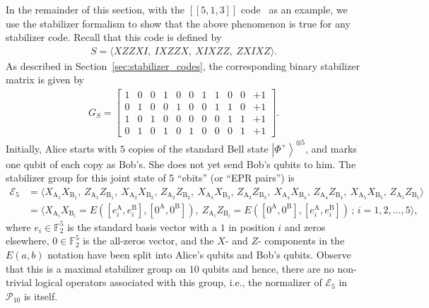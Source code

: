 \documentclass[journal,onecolumn]{IEEEtran}
\newcommand{\dket}[1]{\left\lvert #1 \right\rangle}
\newcommand{\llbr}{[\![}
\newcommand{\rrbr}{]\!]}
\newif\ifnotes
\newcommand{\narayanan}[1]{\ifnotes{{\color{blue} [Narayanan: #1]}}\fi}
\newcommand{\bane}[1]{\ifnotes{{\color{dkgreen} [Bane: #1]}}\fi}
\begin{document}
In the remainder of this section, with the $\llbr 5,1,3 \rrbr$ code~\cite{Bennett-pra96,Laflamme-prl96} as an example, we use the stabilizer formalism to show that the above phenomenon is true for any stabilizer code.
Recall that this code is defined by
\begin{align}
S = \langle XZZXI, \ IXZZX, \ XIXZZ, \ ZXIXZ \rangle.
\end{align}
As described in Section~\ref{sec:stabilizer_codes}, the corresponding binary stabilizer matrix is given by
\begin{align}
G_S = 
\left[
\begin{array}{ccccc|ccccc|c}
1 & 0 & 0 & 1 & 0   &   0 & 1 & 1 & 0 & 0  &  +1 \\
0 & 1 & 0 & 0 & 1   &   0 & 0 & 1 & 1 & 0  &  +1 \\
1 & 0 & 1 & 0 & 0   &   0 & 0 & 0 & 1 & 1  &  +1 \\
0 & 1 & 0 & 1 & 0   &   1 & 0 & 0 & 0 & 1  &  +1
\end{array}
\right].
\end{align}
Initially, Alice starts with $5$ copies of the standard Bell state $\dket{\Phi^+}^{\otimes 5}$, and marks one qubit of each copy as Bob's.
She does not yet send Bob's qubits to him.
The stabilizer group for this joint state of 5 ``ebits'' (or ``EPR pairs'') is
\begin{align}
\mathcal{E}_5 & = \langle X_{\text{A}_1} X_{\text{B}_1}, \, Z_{\text{A}_1} Z_{\text{B}_1}, \ X_{\text{A}_2} X_{\text{B}_2}, \, Z_{\text{A}_2} Z_{\text{B}_2}, \ X_{\text{A}_3} X_{\text{B}_3}, \, Z_{\text{A}_3} Z_{\text{B}_3}, \ X_{\text{A}_4} X_{\text{B}_4}, \, Z_{\text{A}_4} Z_{\text{B}_4}, \ X_{\text{A}_5} X_{\text{B}_5}, \, Z_{\text{A}_5} Z_{\text{B}_5} \rangle \\
%
  & = \langle X_{\text{A}_i} X_{\text{B}_i} =  E([e_i^{\text{A}}, e_i^{\text{B}}], [0^{\text{A}}, 0^{\text{B}}]), \ Z_{\text{A}_i} Z_{\text{B}_i} = E([0^{\text{A}}, 0^{\text{B}}],[e_i^{\text{A}}, e_i^{\text{B}}]) \, ; \, i = 1,2,\ldots,5  \rangle,
\end{align}
where $e_i \in \mathbb{F}_2^5$ is the standard basis vector with a $1$ in position $i$ and zeros elsewhere, $0 \in \mathbb{F}_2^5$ is the all-zeros vector, and the $X$- and $Z$- components in the $E(a,b)$ notation have been split into Alice's qubits and Bob's qubits.
Observe that this is a maximal stabilizer group on $10$ qubits and hence, there are no non-trivial logical operators associated with this group, i.e., the normalizer of $\mathcal{E}_5$ in $\mathcal{P}_{10}$ is itself.
\end{document}
